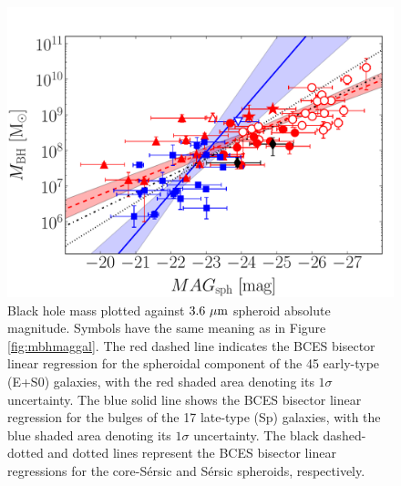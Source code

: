 \documentclass[preprint2]{emulateapj}
\begin{document}
\begin{figure}[h]
\begin{center}
\includegraphics[width=\columnwidth]{mbh_vs_mag_sph.pdf}
\caption{Black hole mass plotted against $3.6\rm~\mu m$ spheroid absolute magnitude. 
Symbols have the same meaning as in Figure \ref{fig:mbhmaggal}.
The red dashed line indicates the BCES bisector linear regression for the spheroidal component of the 45 early-type (E+S0) galaxies, 
with the red shaded area denoting its $1\sigma$ uncertainty. 
The blue solid line shows the BCES bisector linear regression for the bulges of the 17 late-type (Sp) galaxies, 
with the blue shaded area denoting its $1\sigma$ uncertainty. 
The black dashed-dotted and dotted lines represent the BCES bisector linear regressions for the core-S\'ersic and S\'ersic spheroids, respectively.}
\label{fig:mbhmagsph}
\end{center}
\end{figure}
\end{document}
